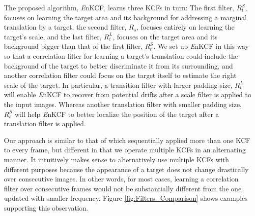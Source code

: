 \documentclass[10pt,twocolumn,letterpaper]{article}
\begin{document}
The proposed algorithm, {\it E}nKCF, learns three KCFs in turn: The
first filter, $R_{t}^{S}$, focuses on learning the target area and its
background for addressing a marginal translation by a target, the
second filter, $R_{s}$, focuses entirely on learning the target's
scale, and the last filter, $R_{t}^{L}$, focuses on the target area
and its background bigger than that of the first filter,
$R_{t}^{S}$. We set up {\it E}nKCF in this way so that a correlation
filter for learning a target's translation could include the
background of the target to better discriminate it from its
surrounding, and another correlation filter could focus on the target
itself to estimate the right scale of the target. In particular, a
transition filter with larger padding size, $R_{t}^{L}$ will enable
{\it E}nKCF to recover from potential drifts after a scale filter is
applied to the input images. Whereas another translation filter with
smaller padding size, $R_{t}^{S}$ will help {\it E}nKCF to better
localize the position of the target after a translation filter is
applied.

Our approach is similar to that of \cite{ma2015long} which
sequentially applied more than one KCF to every frame, but different
in that we operate multiple KCFs in an alternating manner. It
intuitively makes sense to alternatively use multiple KCFs with
different purposes because the appearance of a target does not change
drastically over consecutive images. In other words, for most cases,
learning a correlation filter over consecutive frames would not be
substantially different from the one updated with smaller
frequency. Figure \ref{fig:Filters_Comparison} shows examples
supporting this observation.

\end{document}
